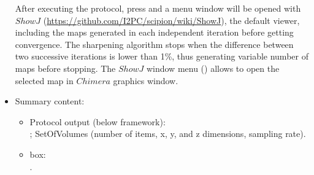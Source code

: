 \begin{itemize}
  After executing the protocol, press  and a menu window will be opened with $ShowJ$ (\url{https://github.com/I2PC/scipion/wiki/ShowJ}), the default \scipion viewer, including the maps generated in each independent iteration before getting convergence. The sharpening algorithm stops when the difference between two successive iterations is lower than 1\%, thus generating variable number of maps before stopping. The $ShowJ$ window menu () allows to open the selected map in $Chimera$ graphics window.
  
  \item Summary content:
  \begin{itemize}
     \item Protocol output (below \scipion framework):\\ ; SetOfVolumes (number of items, x, y, and z dimensions, sampling rate).
     \item {} box:\\ .
  \end{itemize}
    
\end{itemize}

